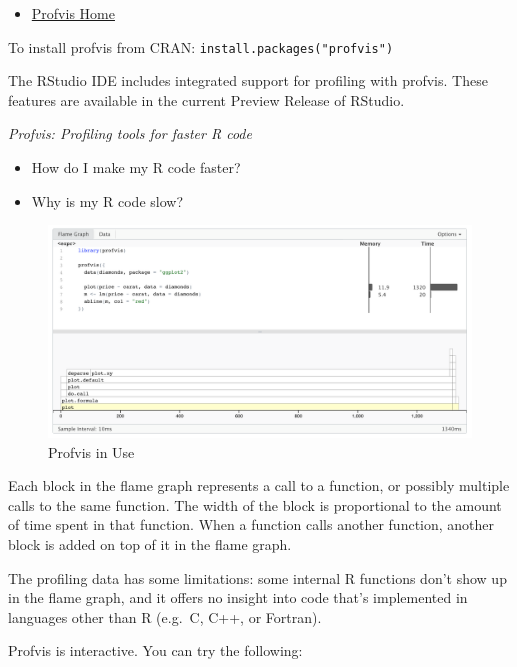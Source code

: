 \documentclass[]{book}
\providecommand{\tightlist}{%
  \setlength{\itemsep}{0pt}\setlength{\parskip}{0pt}}
\theoremstyle{definition}
\theoremstyle{definition}
\theoremstyle{definition}
\theoremstyle{remark}
\begin{document}
\begin{itemize}
\tightlist
\item
  \href{https://rstudio.github.io/profvis/}{Profvis Home}
\end{itemize}

To install profvis from CRAN: \texttt{install.packages("profvis")}

The RStudio IDE includes integrated support for profiling with profvis.
These features are available in the current Preview Release of RStudio.

\emph{Profvis: Profiling tools for faster R code}

\begin{itemize}
\tightlist
\item
  How do I make my R code faster?
\item
  Why is my R code slow?
\end{itemize}

\begin{figure}
\centering
\includegraphics{imgs/profiling/use-profvis.png}
\caption{Profvis in Use}
\end{figure}

Each block in the flame graph represents a call to a function, or
possibly multiple calls to the same function. The width of the block is
proportional to the amount of time spent in that function. When a
function calls another function, another block is added on top of it in
the flame graph.

The profiling data has some limitations: some internal R functions don't
show up in the flame graph, and it offers no insight into code that's
implemented in languages other than R (e.g.~C, C++, or Fortran).

Profvis is interactive. You can try the following:
\end{document}
